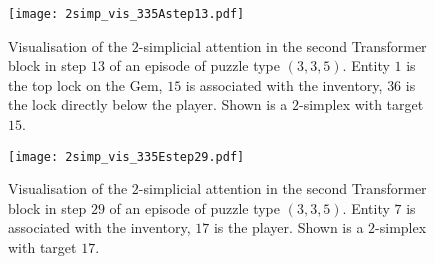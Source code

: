 \documentclass{article} %
\begin{document}
\begin{figure}[h]
\begin{center}
\texttt{[image: 2simp\_vis\_335Astep13.pdf]}
\end{center}
\caption{Visualisation of the $2$-simplicial attention in the second Transformer block in step $13$ of an episode of puzzle type $(3,3,5)$. Entity $1$ is the top lock on the Gem, $15$ is associated with the inventory, $36$ is the lock directly below the player. Shown is a $2$-simplex with target $15$.}
\label{figure:335Astep13}
\end{figure}

\begin{figure}[h]
\begin{center}
\texttt{[image: 2simp\_vis\_335Estep29.pdf]}
\end{center}
\caption{Visualisation of the $2$-simplicial attention in the second Transformer block in step $29$ of an episode of puzzle type $(3,3,5)$. Entity $7$ is associated with the inventory, $17$ is the player. Shown is a $2$-simplex with target $17$.}
\label{figure:335Estep29}
\end{figure}
\end{document}
